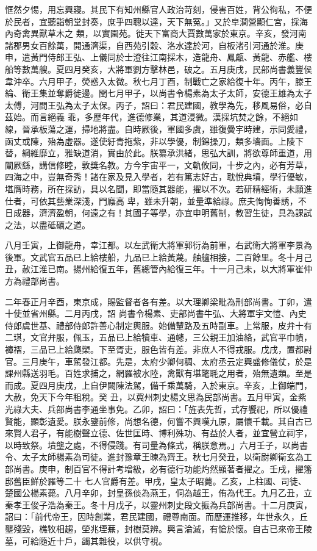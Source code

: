 \begin{pinyinscope}
 恇然夕惕，用忘興寢。其民下有知州縣官人政治苛刻，侵害百姓，背公徇私，不便於民者，宜聽詣朝堂封奏，庶乎四聰以達，天下無冤。」又於皁澗營顯仁宮，採海內奇禽異獸草木之
 類，以實園苑。徙天下富商大賈數萬家於東京。辛亥，發河南諸郡男女百餘萬，開通濟渠，自西苑引穀、洛水達於河，自板渚引河通於淮。庚申，遣黃門侍郎王弘、上儀同於士澄往江南採木，造龍舟、鳳甗、黃龍、赤艦、樓船等數萬艘。夏四月癸亥，大將軍劉方擊林邑，破之。五月庚戌，民部尚書義豐侯韋沖卒。六月甲子，熒惑入太微。秋七月丁酉，制戰亡之家給復十年。丙午，滕王綸、衛王集並奪爵徙邊。閏七月甲子，以尚書令楊素為太子太師，安德王雄為太子太傅，河間王弘為太子太保。丙子，詔曰：君民建國，教學為先，移風易俗，必自茲始。而言絕義
 乖，多歷年代，進德修業，其道浸微。漢採坑焚之餘，不絕如線，晉承板蕩之運，掃地將盡。自時厥後，軍國多虞，雖復黌宇時建，示同愛禮，函丈或陳，殆為虛器。遂使紆青拖紫，非以學優，制錦操刀，類多墻面。上陵下替，綱維靡立，雅缺道消，實由於此。朕纂承洪緒，思弘大訓，將欲尊師重道，用闡厥繇，講信修睦，敦獎名教。方今宇宙平一，文軌攸同，十步之內，必有芳草，四海之中，豈無奇秀！諸在家及見入學者，若有篤志好古，耽悅典墳，學行優敏，堪膺時務，所在採訪，具以名聞，即當隨其器能，擢以不次。若研精經術，未願進仕者，可依其藝業深淺，門廕高
 卑，雖未升朝，並量準給祿。庶夫恂恂善誘，不日成器，濟濟盈朝，何遠之有！其國子等學，亦宜申明舊制，教習生徒，具為課試之法，以盡砥礪之道。



 八月壬寅，上御龍舟，幸江都。以左武衛大將軍郭衍為前軍，右武衛大將軍李景為後軍。文武官五品已上給樓船，九品已上給黃蔑。舳艫相接，二百餘里。冬十月己丑，赦江淮已南。揚州給復五年，舊總管內給復三年。十一月己未，以大將軍崔仲方為禮部尚書。



 二年春正月辛酉，東京成，賜監督者各有差。以大理卿梁毗為刑部尚書。丁卯，遣十使並省州縣。二月丙戌，詔
 尚書令楊素、吏部尚書牛弘、大將軍宇文愷、內史侍郎虞世基、禮部侍郎許善心制定輿服。始備輦路及五時副車。上常服，皮弁十有二琪，文官弁服，佩玉，五品已上給犢車、通幰，三公親王加油絡，武官平巾幘，褲褶，三品已上給瓟槊。下至胥吏，服色皆有差。非庶人不得戎服。戊戌，置都尉官。三月庚午，車駕發江都。先是，太府少卿何稠、太府丞云定興盛修儀仗，於是課州縣送羽毛。百姓求捕之，網羅被水陸，禽獸有堪氅毦之用者，殆無遺類。至是而成。夏四月庚戌，上自伊闕陳法駕，備千乘萬騎，入於東京。辛亥，上御端門，大赦，免天下今年租稅。癸
 丑，以冀州刺史楊文思為民部尚書。五月甲寅，金紫光祿大夫、兵部尚書李通坐事免。乙卯，詔曰：「旌表先哲，式存饗祀，所以優禮賢能，顯彰遺愛。朕永鑒前修，尚想名德，何嘗不興嘆九原，屬懷千載。其自古已來賢人君子，有能樹聲立德、佐世匡時、博利殊功、有益於人者，並宜營立祠宇，以時致祭。墳壟之處，不得侵踐。有司量為條式，稱朕意焉。」六月壬子，以尚書令、太子太師楊素為司徒。進封豫章王暕為齊王。秋七月癸丑，以衛尉卿衛玄為工部尚書。庚申，制百官不得計考增級，必有德行功能灼然顯著者擢之。壬戌，擢籓邸舊臣鮮於羅等二十
 七人官爵有差。甲戌，皇太子昭薨。乙亥，上柱國、司徒、楚國公楊素薨。八月辛卯，封皇孫倓為燕王，侗為越王，侑為代王。九月乙丑，立秦孝王俊子浩為秦王。冬十月戊子，以靈州刺史段文振為兵部尚書。十二月庚寅，詔曰：「前代帝王，因時創業，君民建國，禮尊南面。而歷運推移，年世永久，丘壟殘毀，樵牧相趨，塋兆堙蕪，封樹莫辨。興言淪滅，有愴於懷。自古已來帝王陵墓，可給隨近十戶，蠲其雜役，以供守視。




\end{pinyinscope}
